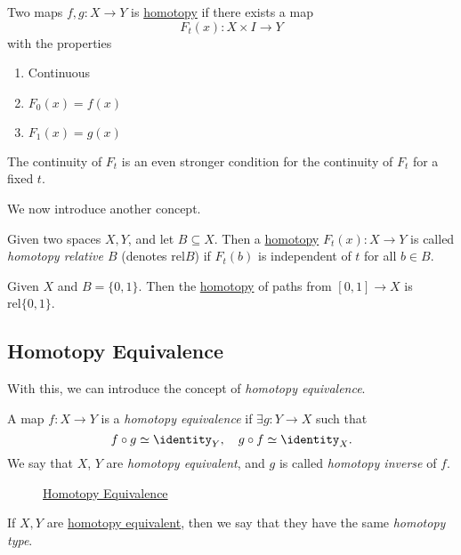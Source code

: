 \begin{prev}
	Two maps \(f, g\colon X\to Y\) is \hyperref[def:homotopy]{homotopy} if there exists a map
	\[
		F_t(x)\colon X\times I\to Y
	\]
	with the properties
	\begin{enumerate}
		\item Continuous
		\item \(F_0(x) = f(x)\)
		\item \(F_1(x) = g(x)\)
	\end{enumerate}
	\begin{remark}
		The continuity of \(F_t\) is an even stronger condition for the continuity of \(F_t\) for a fixed \(t\).
	\end{remark}
\end{prev}

We now introduce another concept.
\begin{definition}\label{def:homotopy-relative}
	Given two spaces \(X, Y\), and let \(B\subseteq X\). Then a \hyperref[def:homotopy]{homotopy} \(F_t(x)\colon X\to Y\) is called
	\emph{homotopy relative \(B\)} (denotes \(\mathrm{rel} B\)) if \(F_t(b)\) is independent of \(t\) for all \(b\in B\).
\end{definition}

\begin{eg}
	Given \(X\) and \(B = \{0, 1\}\). Then the \hyperref[def:homotopy]{homotopy} of paths from \([0, 1]\to X\) is
	\(\mathrm{rel} \{0, 1\}\).
	\begin{figure}[H]
		\centering
		\label{fig:eg:rel-homotopy}
	\end{figure}
\end{eg}

\subsection{Homotopy Equivalence}
With this, we can introduce the concept of \emph{homotopy equivalence}.
\begin{definition}\label{def:homotopy-equivalence}\label{def:homotopy-inverse}
	A map \(f\colon X\to Y\) is a \emph{homotopy equivalence} if \(\exists g\colon Y\to X\) such that
	\[
		f\circ g \simeq \identity_Y, \quad g\circ f \simeq \identity_X.
	\]
	We say that \(X\), \(Y\) are \emph{homotopy equivalent}, and \(g\) is called \emph{homotopy inverse} of \(f\).
\end{definition}
\begin{figure}[H]
	\centering
	\caption{\hyperref[def:homotopy-equivalence]{Homotopy Equivalence}}
	\label{fig:def:homotopy-equivalence}
\end{figure}
If \(X, Y\) are \hyperref[def:homotopy-equivalence]{homotopy equivalent}, then we say that they have the
same \emph{homotopy type}\label{def:homotopy-type}.

